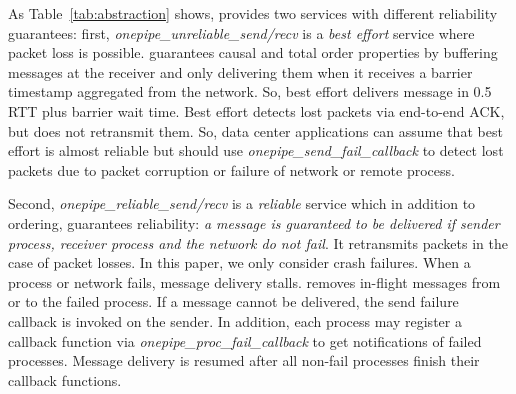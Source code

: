 As Table~\ref{tab:abstraction} shows, \sys{} provides two services with different reliability guarantees: first, \textit{onepipe\_unreliable\_send/recv} is a \emph{best effort} service where packet loss is possible. \sys{} guarantees causal and total order properties by buffering messages at the receiver and only delivering them when it receives a barrier timestamp aggregated from the network. So, best effort \sys{} delivers message in 0.5 RTT plus barrier wait time. %
Best effort \sys{} detects lost packets via end-to-end ACK, but does not retransmit them. 
So, data center applications can assume that best effort \sys{} is almost reliable but should use \textit{onepipe\_send\_fail\_callback} to detect lost packets due to packet corruption or failure of network or remote process. 

Second, \textit{onepipe\_reliable\_send/recv} is a \emph{reliable} service which in addition to ordering, guarantees reliability: \emph{a message is guaranteed to be delivered if sender process, receiver process and the network do not fail}. It retransmits packets in the case of packet losses. In this paper, we only consider crash failures. When a process or network fails, message delivery stalls.
\sys{} removes in-flight messages from or to the failed process.
If a message cannot be delivered, the send failure callback is invoked on the sender.
In addition, each process may register a callback function via \textit{onepipe\_proc\_fail\_callback} to get notifications of failed processes. Message delivery is resumed after all non-fail processes finish their callback functions.

